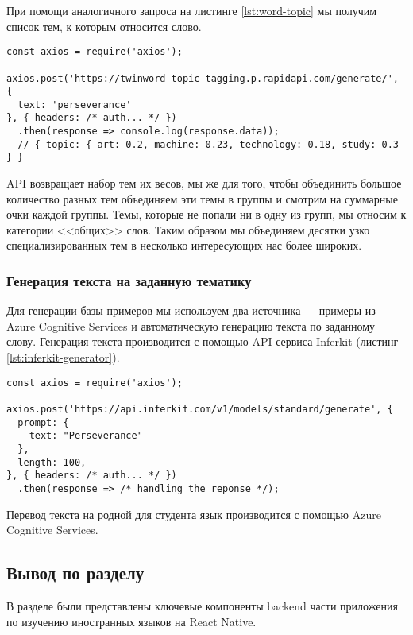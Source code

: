 При помощи аналогичного запроса на листинге \ref{lst:word-topic} мы получим список тем, к которым относится слово.

\begin{lstlisting}[basicstyle=\fontsize{11}{11}\selectfont,tabsize=4,breaklines=true,caption={Пример получения тем, к которым относится слово.},captionpos=b,label={lst:word-topic}]
const axios = require('axios');

axios.post('https://twinword-topic-tagging.p.rapidapi.com/generate/', {
  text: 'perseverance'
}, { headers: /* auth... */ })
  .then(response => console.log(response.data));
  // { topic: { art: 0.2, machine: 0.23, technology: 0.18, study: 0.3 } }
\end{lstlisting}

API возвращает набор тем их весов, мы же для того, чтобы объединить большое количество разных тем объединяем эти темы в группы и смотрим на суммарные очки каждой группы. Темы, которые не попали ни в одну из групп, мы относим к категории <<общих>> слов. Таким образом мы объединяем десятки узко специализированных тем в несколько интересующих нас более широких.

\subsubsection{Генерация текста на заданную тематику}
Для генерации базы примеров мы используем два источника --- примеры из Azure Cognitive Services и автоматическую генерацию текста по заданному слову. Генерация текста производится с помощью API сервиса Inferkit (листинг \ref{lst:inferkit-generator}).

\begin{lstlisting}[basicstyle=\fontsize{11}{11}\selectfont,tabsize=4,breaklines=true,caption={Пример генерации текста с помощью Inferkit.},captionpos=b,label={lst:inferkit-generator}]
const axios = require('axios');

axios.post('https://api.inferkit.com/v1/models/standard/generate', {
  prompt: {
    text: "Perseverance"
  },
  length: 100,
}, { headers: /* auth... */ })
  .then(response => /* handling the reponse */);
\end{lstlisting}

Перевод текста на родной для студента язык производится с помощью Azure Cognitive Services.

\subsection{Вывод по разделу}
В разделе были представлены ключевые компоненты backend части приложения по изучению иностранных языков на React Native. 

